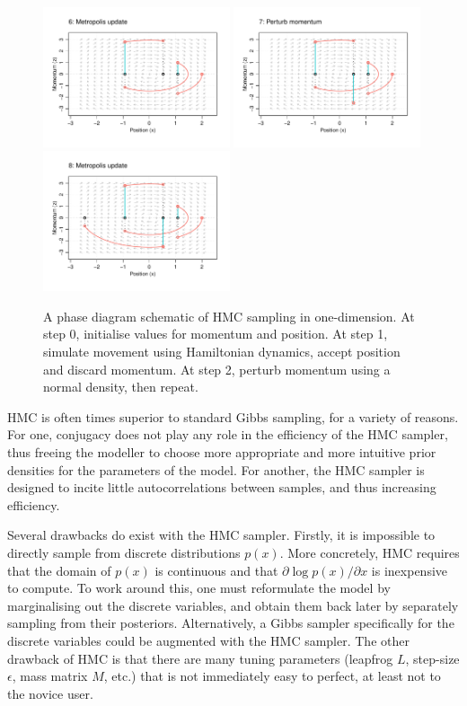 \begin{figure}[p]
  \includegraphics[width=0.49\textwidth]{figure/04-phase6}
  \vspace{-20pt}  
  \includegraphics[width=0.49\textwidth]{figure/04-phase7}
  \includegraphics[width=0.49\textwidth]{figure/04-phase8}
  \caption{A phase diagram schematic of HMC sampling in one-dimension. At step 0, initialise values for momentum and position. At step 1, simulate movement using Hamiltonian dynamics, accept position and discard momentum. At step 2, perturb momentum using a normal density, then repeat.}
\end{figure}

HMC is often times superior to standard Gibbs sampling, for a variety of reasons. 
For one, conjugacy does not play any role in the efficiency of the HMC sampler, thus freeing the modeller to choose more appropriate and more intuitive prior densities for the parameters of the model. 
For another, the HMC sampler is designed to incite little autocorrelations between samples, and thus increasing efficiency.

Several drawbacks do exist with the HMC sampler. Firstly, it is impossible to directly sample from discrete distributions $p(x)$.
More concretely, HMC requires that the domain of $p(x)$ is continuous and that $\partial \log p(x) / \partial x$ is inexpensive to compute.
To work around this, one must reformulate the model by marginalising out the discrete variables, and obtain them back later by separately sampling from their posteriors.
Alternatively, a Gibbs sampler specifically for the discrete variables could be augmented with the HMC sampler.
The other drawback of HMC is that there are many tuning parameters (leapfrog $L$, step-size $\epsilon$, mass matrix $M$, etc.)  that is not immediately easy to perfect, at least not to the novice user. 

